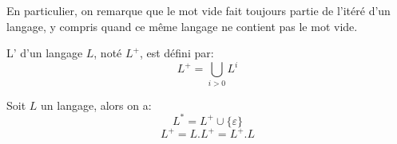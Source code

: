 En particulier, on remarque que le mot vide fait toujours partie de l'itéré d'un langage, y compris quand ce même langage ne contient pas le mot vide.

\begin{definition}
	L' d'un langage \( L \), noté \( L^+ \), est défini par:
	\begin{equation}
		L^+ = \bigcup_{i > 0} L^i
	\end{equation}
\end{definition}

\begin{proposition}
	Soit \( L \) un langage, alors on a:
	\begin{equation}
		L^* = L^+ \cup \{ \varepsilon \}
	\end{equation}
	\begin{equation}
		L^+ = L.L^+ = L^+.L
	\end{equation}
\end{proposition}
